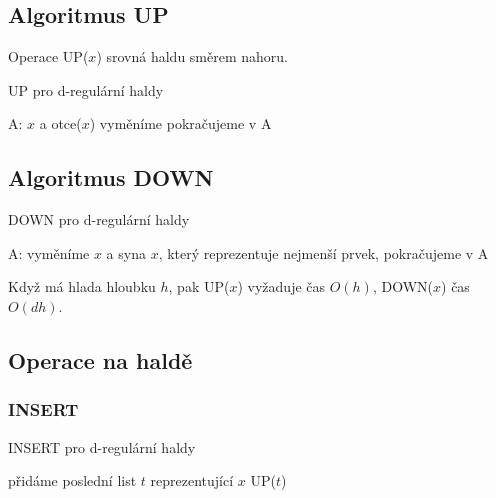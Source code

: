 \subsection{Algoritmus UP}

Operace UP($x$) srovná haldu směrem nahoru.

\begin{algorithm}[!htb]
\caption{UP pro d-regulární haldy}
\label{alg:heap.dreg.up}
\begin{algorithmic}
\STATE A: 
  \STATE $x$ a otce($x$) vyměníme 
  \STATE pokračujeme v A
\ENDIF
\end{algorithmic}
\end{algorithm}


\subsection{Algoritmus DOWN}

\begin{algorithm}[!htb]
\caption{DOWN pro d-regulární haldy}
\label{alg:heap.dreg.down}
\begin{algorithmic}
\STATE A:
  \STATE vyměníme $x$ a syna $x$, který reprezentuje nejmenší prvek,
  \STATE pokračujeme v A
\ENDIF
\end{algorithmic}
\end{algorithm}

\begin{pozn}
Když má hlada hloubku $h$, pak UP($x$) vyžaduje čas $O(h)$, DOWN($x$) čas
$O(dh)$.
\end{pozn}

\subsection{Operace na haldě}

\subsubsection{INSERT}

\begin{algorithm}[!htb]
\caption{INSERT pro d-regulární haldy}
\label{alg:heap.dreg.insert}
\begin{algorithmic}
\STATE přidáme poslední list $t$ reprezentující $x$
\STATE UP($t$)
\end{algorithmic}
\end{algorithm}

